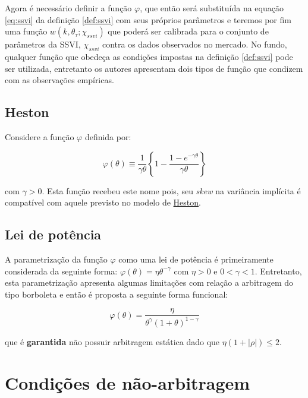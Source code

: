 \documentclass[]{book}
\theoremstyle{definition}
\theoremstyle{definition}
\theoremstyle{definition}
\theoremstyle{remark}
\begin{document}
Agora é necessário definir a função \(\varphi\), que então será
substituída na equação \eqref{eq:ssvi} da definição \ref{def:ssvi} com
seus próprios parâmetros e teremos por fim uma função
\(w(k, \theta_\tau; \chi_{ssvi})\) que poderá ser calibrada para o
conjunto de parâmetros da SSVI, \(\chi_{ssvi}\) contra os dados
observados no mercado. No fundo, qualquer função que obedeça as
condições impostas na definição \ref{def:ssvi} pode ser utilizada,
entretanto os autores apresentam dois tipos de função que condizem com
as observações empíricas.

\subsection{Heston}\label{heston-1}

Considere a função \(\varphi\) definida por:

\begin{equation}
\varphi(\theta)\equiv\frac{1}{\gamma\theta}\left\lbrace 1-\frac{1-e^{-\gamma\theta}}{\gamma\theta}\right\rbrace
\label{eq:heston-phi}
\end{equation}

com \(\gamma > 0\). Esta função recebeu este nome pois, seu \emph{skew}
na variância implícita é compatível com aquele previsto no modelo de
\protect\hyperlink{superficies}{Heston}.

\subsection{Lei de potência}\label{lei-de-potencia}

A parametrização da função \(\varphi\) como uma lei de potência é
primeiramente considerada da seguinte forma:
\(\varphi(\theta)=\eta\theta^{-\gamma}\) com \(\eta > 0\) e
\(0<\gamma<1\). Entretanto, esta parametrização apresenta algumas
limitações com relação a arbitragem do tipo borboleta e então é proposta
a seguinte forma funcional:

\begin{equation}
\varphi(\theta)=\frac{\eta}{\theta^\gamma(1+\theta)^{1-\gamma}}
\label{eq:pl-phi}
\end{equation}

que é \textbf{garantida} não possuir arbitragem estática dado que
\(\eta(1+|\rho|)\leq 2\).

\section{Condições de não-arbitragem}\label{condicoes-de-nao-arbitragem}
\end{document}
